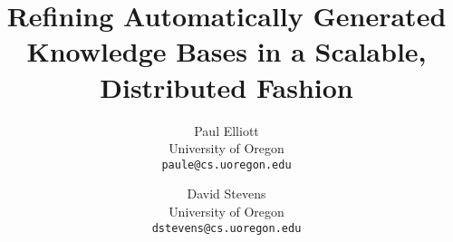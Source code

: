 \documentclass[letterpaper,11pt]{article}
\date{}
\begin{document}
\setcounter{page}{1}
\pagestyle{plain}


\title{\bf Refining Automatically Generated Knowledge Bases in a Scalable, Distributed Fashion}
\author{
{Paul Elliott}\\
University of Oregon\\
\texttt{paule@cs.uoregon.edu}
\and
{David Stevens}\\
University of Oregon\\
\texttt{dstevens@cs.uoregon.edu}
}

\maketitle


\end{document}
